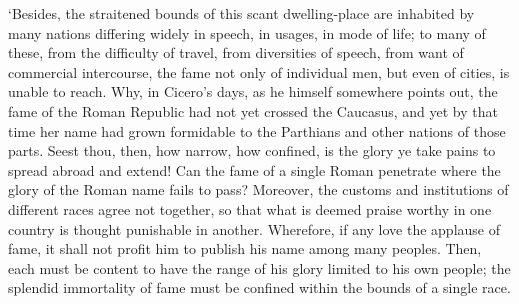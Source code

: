 \documentclass[11pt]{book}
\begin{document}
`Besides, the straitened bounds of this scant dwelling-place are
inhabited by many nations differing widely in speech, in usages, in mode
of life; to many of these, from the difficulty of travel, from
diversities of speech, from want of commercial intercourse, the fame not
only of individual men, but even of cities, is unable to reach. Why, in
Cicero's days, as he himself somewhere points out, the fame of the Roman
Republic had not yet crossed the Caucasus, and yet by that time her
name had grown formidable to the Parthians and other nations of those
parts. Seest thou, then, how narrow, how confined, is the glory ye take
pains to spread abroad and extend! Can the fame of a single Roman
penetrate where the glory of the Roman name fails to pass? Moreover, the
customs and institutions of different races agree not together, so that
what is deemed praise worthy in one country is thought punishable in
another. Wherefore, if any love the applause of fame, it shall not
profit him to publish his name among many peoples. Then, each must be
content to have the range of his glory limited to his own people; the
splendid immortality of fame must be confined within the bounds of a
single race.
\end{document}
